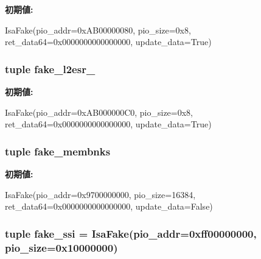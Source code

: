 {\bfseries 初期値:}
\begin{DoxyCode}
IsaFake(pio_addr=0xAB00000080, pio_size=0x8,
            ret_data64=0x0000000000000000, update_data=True)
\end{DoxyCode}
\hypertarget{classT1000_1_1T1000_affe1acd165521689a19e972386e3c79d}{
\subsubsection[{fake\_\-l2esr\_\-4}]{\setlength{\rightskip}{0pt plus 5cm}tuple {\bf fake\_\-l2esr\_}}}
\label{classT1000_1_1T1000_affe1acd165521689a19e972386e3c79d}
{\bfseries 初期値:}
\begin{DoxyCode}
IsaFake(pio_addr=0xAB000000C0, pio_size=0x8,
            ret_data64=0x0000000000000000, update_data=True)
\end{DoxyCode}
\hypertarget{classT1000_1_1T1000_a8a303fdaceb9b90367c1ede9a5ae3c9e}{
\subsubsection[{fake\_\-membnks}]{\setlength{\rightskip}{0pt plus 5cm}tuple {\bf fake\_\-membnks}}}
\label{classT1000_1_1T1000_a8a303fdaceb9b90367c1ede9a5ae3c9e}
{\bfseries 初期値:}
\begin{DoxyCode}
IsaFake(pio_addr=0x9700000000, pio_size=16384,
            ret_data64=0x0000000000000000, update_data=False)
\end{DoxyCode}
\hypertarget{classT1000_1_1T1000_a7a90b18da7616b6d322418d5e55db47d}{
\subsubsection[{fake\_\-ssi}]{\setlength{\rightskip}{0pt plus 5cm}tuple {\bf fake\_\-ssi} = {\bf IsaFake}(pio\_\-addr=0xff00000000, pio\_\-size=0x10000000)}}
\label{classT1000_1_1T1000_a7a90b18da7616b6d322418d5e55db47d}
